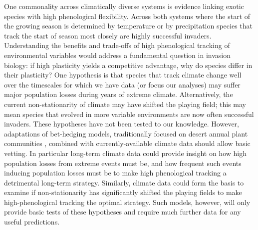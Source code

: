 \documentclass[11pt,a4paper,oneside]{article}
\begin{document}
One commonality across climatically diverse systems is evidence linking exotic species with high phenological flexibility. Across both systems where the start of the growing season is determined by temperature \citep{wolkovichAmBot2013} or by precipitation \citep{Wainwright:2012tw} species that track the start of season most closely are highly successful invaders. Understanding the benefits and trade-offs of high phenological tracking of environmental variables would address a fundamental question in invasion biology: if high plasticity yields a competitive advantage, why do species differ in their plasticity? One hypothesis is that species that track climate change well over the timescales for which we have data (or focus our analyses) may suffer major population losses during years of extreme climate. Alternatively, the current non-stationarity of climate may have shifted the playing field; this may mean species that evolved in more variable environments are now often successful invaders. These hypotheses have not been tested to our knowledge. However, adaptations of bet-hedging models, traditionally focused on desert annual plant communities \citep[e.g.,][]{donald2013}, combined with currently-available climate data should allow basic vetting. In particular long-term climate data could provide insight on how high population losses from extreme events must be, and how frequent such events inducing population losses must be to make high phenological tracking a detrimental long-term strategy. Similarly, climate data could form the basis to examine if non-stationarity has significantly shifted the playing fields to make high-phenological tracking the optimal strategy. Such models, however, will only provide basic tests of these hypotheses and require much further data for any useful predictions.\\
\\
\end{document}
